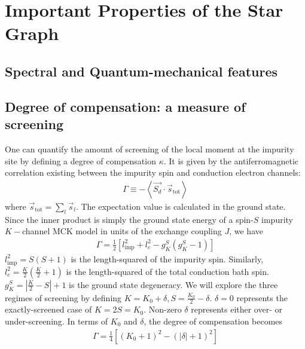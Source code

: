 \documentclass[reprint,prb,superscriptaddress]{revtex4-2}
\begin{document}
\section{Important Properties of the Star Graph}
\subsection{Spectral and Quantum-mechanical features}

\subsection{Degree of compensation: a measure of screening}
One can quantify the amount of screening of the local moment at the impurity site by defining a degree of compensation \(\kappa\). It is given by the antiferromagnetic correlation existing between the impurity spin and conduction electron channels:
\begin{equation}\begin{aligned}
	\Gamma \equiv - \left< \vec{S_d}\cdot \vec{s}_\text{tot}\right>
\end{aligned}\end{equation}
where \(\vec s_\text{tot} = \sum_l \vec s_l\). The expectation value is calculated in the ground state. Since the inner product is simply the ground state energy of a spin-\(S\) impurity \(K-\)channel MCK model in units of the exchange coupling \(J\), we have
\begin{equation}\begin{aligned}
	\Gamma = \frac{1}{2} \left[ l_\text{imp}^2 + l_c^2 - g^S_K\left( g^S_K - 1 \right)\right]
\end{aligned}\end{equation}
\(l_\text{imp}^2 = S(S+1)\) is the length-squared of the impurity spin. Similarly, \(l_c^2 = \frac{K}{2}\left(\frac{K}{2} + 1\right) \) is the length-squared of the total conduction bath spin. \(g^S_K = |\frac{K}{2} - S| + 1\) is the ground state degeneracy. We will explore the three regimes of screening by defining \(K = K_0 + \delta, S = \frac{K_0}{2} - \delta\). \(\delta=0\) represents the exactly-screened case of \(K = 2S = K_0\). Non-zero \(\delta\) represents either over- or under-screening. In terms of \(K_0\) and \(\delta\), the degree of compensation becomes
\begin{equation}\begin{aligned}
	\label{gamma}
	\Gamma = \frac{1}{4}\left[\left( K_0 + 1 \right) ^2 - \left(|\delta| + 1 \right) ^2\right] 
\end{aligned}\end{equation}
\end{document}
